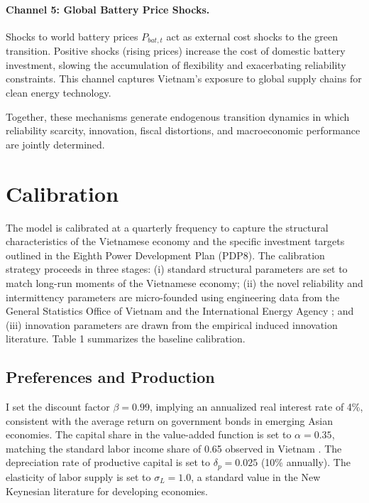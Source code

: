 \documentclass[12pt, a4paper]{article}
\begin{document}
\paragraph{Channel 5: Global Battery Price Shocks.}
Shocks to world battery prices $P_{bat,t}$ act as external cost shocks to the green transition. Positive shocks (rising prices) increase the cost of domestic battery investment, slowing the accumulation of flexibility and exacerbating reliability constraints. This channel captures Vietnam's exposure to global supply chains for clean energy technology.

Together, these mechanisms generate endogenous transition dynamics in which reliability scarcity, innovation, fiscal distortions, and macroeconomic performance are jointly determined.

\section{Calibration} \label{sec:calibration}

The model is calibrated at a quarterly frequency to capture the structural characteristics of the Vietnamese economy and the specific investment targets outlined in the Eighth Power Development Plan (PDP8). The calibration strategy proceeds in three stages: (i) standard structural parameters are set to match long-run moments of the Vietnamese economy; (ii) the novel reliability and intermittency parameters are micro-founded using engineering data from the General Statistics Office of Vietnam \citep{gso2024} and the International Energy Agency \citep{iea2023}; and (iii) innovation parameters are drawn from the empirical induced innovation literature. Table 1 summarizes the baseline calibration.

\subsection{Preferences and Production}
I set the discount factor $\beta = 0.99$, implying an annualized real interest rate of 4\%, consistent with the average return on government bonds in emerging Asian economies. The capital share in the value-added function is set to $\alpha = 0.35$, matching the standard labor income share of 0.65 observed in Vietnam \citep{gso2024}. The depreciation rate of productive capital is set to $\delta_p = 0.025$ (10\% annually). The elasticity of labor supply is set to $\sigma_L = 1.0$, a standard value in the New Keynesian literature for developing economies.
\end{document}

